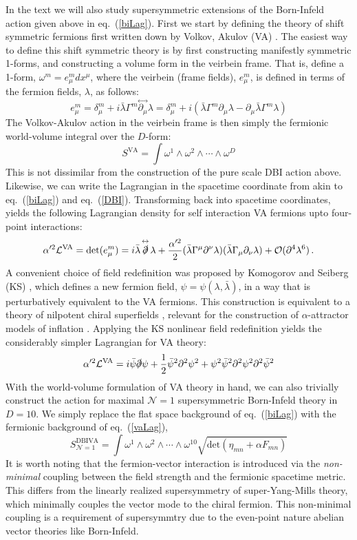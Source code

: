 \documentclass[12pt,letter]{article}
\def\eqn#1{eq.~(\ref{#1})}
\def\be{\begin{equation}}
\def\ee{\end{equation}}
\begin{document}
 In the text we will also study supersymmetric extensions of the Born-Infeld action given above in \eqn{biLag}. First we start by defining the theory of shift symmetric fermions first written down by Volkov, Akulov (VA) \cite{}. The easiest way to define this shift symmetric theory is by first constructing manifestly symmetric 1-forms, and constructing a volume form in the veirbein frame. That is, define a 1-form, $ \omega^m = e^m_\mu dx^\mu$, where the veirbein (frame fields), $e^m_\mu$, is defined in terms of the fermion fields, $\lambda$, as follows:
 \be
 e^m_\mu = \delta^m_\mu + i \bar{\lambda} \Gamma^m\! \stackrel{\leftrightarrow}{\partial_\mu}\!  \lambda = \delta^m_\mu + i (\bar{\lambda} \Gamma^m \partial_\mu  \lambda - \partial_\mu \bar{\lambda} \Gamma^m   \lambda)
 \ee
 The Volkov-Akulov action in the veirbein frame is then simply the fermionic world-volume integral over the $D$-form:
 \be
 S^{\text{VA}} = \int \omega^1 \wedge \omega^2 \wedge \cdots \wedge \omega^D
 \ee
 This is not dissimilar from the construction of the pure scale DBI action above. Likewise, we can write the Lagrangian in the spacetime coordinate from akin to \eqn{biLag} and \eqn{DBI}. Transforming back into spacetime coordinates, yields the following Lagrangian density for self interaction VA fermions upto four-point interactions:
\begin{equation}
 \label{vaLag}
  \alpha'^2\mathcal{L}^{\text{VA}} = \text{det}(e^m_\mu) =  i\bar{\lambda}\!\stackrel{\leftrightarrow}{\slashed{\partial}}\!\lambda+ \frac{\alpha'^2}{2}(\bar{\lambda}\Gamma^\mu \partial^\nu \lambda)(\bar{\lambda}\Gamma_\mu \partial_\nu \lambda)+\mathcal{O}(\partial^4\lambda^6) 
  \,.
\end{equation}
 A convenient choice of field redefinition was proposed by Komogorov and Seiberg (KS) \cite{}, which defines a new fermion field, $\psi = \psi(\lambda,\bar{\lambda})$, in a way that is perturbatively equivalent to the VA fermions. This construction is equivalent to a theory of nilpotent chiral superfields \cite{}, relevant for the construction of $\alpha$-attractor models of inflation \cite{}. Applying the KS nonlinear field redefinition yields the considerably simpler Lagrangian for VA theory:
 \be
   \alpha'^2\mathcal{L}^{\text{VA}} = i\bar{\psi}\slashed{\partial}\psi +\frac{1}{2} \bar{\psi}^2 \partial^2 \psi^2 + \psi^2\bar{\psi}^2 \partial^2 \psi^2\partial^2 \bar{\psi}^2
 \ee
With the world-volume formulation of VA theory in hand, we can also trivially construct the action for maximal $\mathcal{N}=1$ supersymmetric Born-Infeld theory in $D=10$. We simply replace the flat space background of \eqn{biLag} with the fermionic background of \eqn{vaLag},
\be
 \label{DBIVALag}
S^{\text{DBIVA}}_{\mathcal{N}=1} = \int \omega^1 \wedge\omega^2 \wedge \cdots \wedge \omega^{10} \sqrt{\text{det}(\eta_{mn}+ \alpha F_{mn})}
\ee
It is worth noting that the fermion-vector interaction is introduced via the \textit{non-minimal} coupling between the field strength and the fermionic spacetime metric. This differs from the linearly realized supersymmetry of super-Yang-Mills theory, which minimally couples the vector mode to the chiral fermion. This non-minimal coupling is a requirement of supersymmtry due to the even-point nature abelian vector theories like Born-Infeld.
\end{document}

